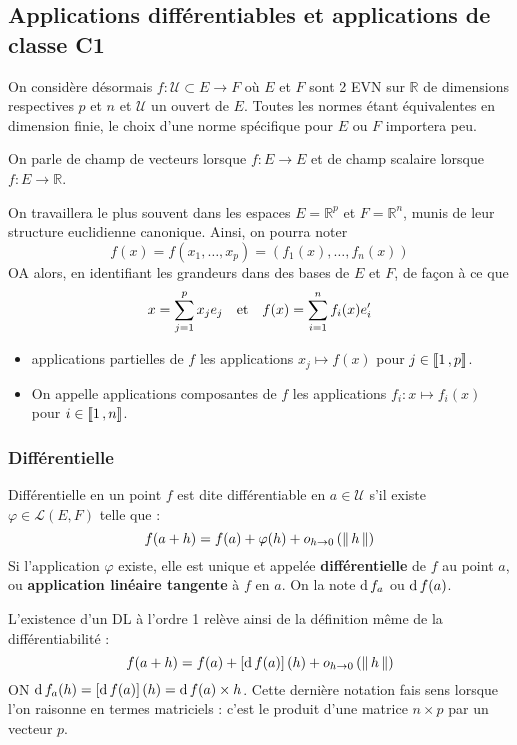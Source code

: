 \subsection{Applications différentiables et applications de classe C1}

    On considère désormais $f : \mathcal{U} \subset E \to F$ où $E$ et $F$ sont 2 EVN sur $\mathbb{R}$ de dimensions respectives $p$ et $n$ et $\mathcal{U}$ un ouvert de $E$. Toutes les normes étant équivalentes en dimension finie, le choix d’une norme spécifique pour $E$ ou $F$ importera peu. 

    On parle de champ de vecteurs lorsque $f : E \to E$ et de champ scalaire lorsque $f : E \to \mathbb{R}$.

    On travaillera le plus souvent dans les espaces $E = \mathbb{R}^p$ et $F = \mathbb{R}^n$, munis de leur structure euclidienne canonique. Ainsi, on pourra noter 
    \[ f(x) = f(x_1,\ldots,x_p) = (f_1(x), \ldots, f_n(x)) \]   
    OA alors, en identifiant les grandeurs dans des bases de $E$ et $F$, de façon à ce que 
    \[ x = \sum_{j=1}^{p} x_j e_j \quad \text{et} \quad f(x) = \sum_{i=1}^{n} f_i(x) e'_i \]   
     \begin{itemize}
        \item applications partielles de $f$ les applications $x_j \mapsto f(x)$ pour $j \in \left\llbracket 1 \, , p \right\rrbracket$.
        \item On appelle applications composantes de $f$ les applications $f_i : x \mapsto f_i(x)$ pour $i \in \left\llbracket 1 \, , n \right\rrbracket$. 
    \end{itemize}
    
    \subsubsection{Différentielle}

    \begin{defitheo}{Différentielle en un point}{}
        $f$ est dite différentiable en $a \in \mathcal{U}$ s’il existe $\varphi \in \mathcal{L}(E,F)$ telle que :
        \[ f(a+h) = f(a) + \varphi(h) + o_{h \rightarrow 0} \left(\left\lVert \,h \, \right\rVert\right) \]   
        Si l’application $\varphi$ existe, elle est unique et appelée \textbf{différentielle} de $f$ au point $a$, ou \textbf{application linéaire tangente} à $f$ en $a$. On la note $\operatorname{d} f_a$ ou $\operatorname{d} f(a)$. 
    \end{defitheo}

    L’existence d’un DL à l’ordre 1 relève ainsi de la définition même de la différentiabilité : 
    \[ f(a+ h) = f(a) + \left[\operatorname{d} f(a)\right](h) + o_{h \rightarrow 0} \left(\left\lVert \,h \, \right\rVert\right) \]   
    ON $\operatorname{d} f_a(h) = \left[\operatorname{d} f(a)\right](h) = \operatorname{d} f(a) \times h$. Cette dernière notation fais sens lorsque l’on raisonne en termes matriciels : c’est le produit d’une matrice $n \times p$ par un vecteur $p$. 

